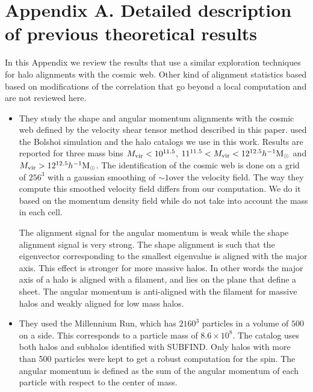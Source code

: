\documentclass[useAMS,usenatbib]{mn2e}
\newcommand{\hMpc}{{\ifmmode{h^{-1}{\rm Mpc}}\else{$h^{-1}$Mpc }\fi}}
\newcommand{\hMsun}{{\ifmmode{h^{-1}{\rm
        {M_{\odot}}}}\else{$h^{-1}{\rm{M_{\odot}}}$~}\fi}}
\begin{document}
\section*{Appendix A. Detailed description of previous theoretical results}

In this Appendix we review the results that use a similar exploration
techniques for halo alignments with the cosmic web. Other kind of
alignment statistics based based on modifications of the correlation
\citep[e.g.][]{Paz2008,Faltenbacher2009} that go beyond a local computation
and are not reviewed here.

\begin{itemize}


\item
\cite{Libeskind2013}

They study the shape and angular momentum alignments with the cosmic
web defined by the velocity shear tensor method described in this
paper.  \cite{Libeskind2013} used the Bolshoi simulation and the halo
catalogs we use in this work. Results are reported for three mass bins $M_{\rm
 vir}<10^{11.5}$\hMsun, $11^{11.5}<M_{\rm vir}<12^{12.5}\hMsun$ and
$M_{\rm  vir}>12^{12.5}\hMsun$. The identification of the cosmic web
is done on a grid of $256^3$ with a gaussian smoothing of $\sim
1$\hMpc over the velocity field. The way they compute this smoothed
velocity field differs from our computation. We do it based on the
momentum density field while \cite{Libesking2013} do not take into
account the mass in each cell.


The alignment signal for the angular momentum is weak while the shape
alignment signal is very strong. The shape alignment is such that the
eigenvector corresponding to the smallest eigenvalue is aligned with
the major axis. This effect is stronger for more massive halos.  In
other words the major axis of a halo is aligned with a filament, and
lies on the plane that define a sheet. The angular momentum is
anti-aligned with the filament for massive halos and weakly aligned
for low mass halos. 

\item
\cite{Trowland2013}

They used the Millennium Run, which has $2160^3$ particles in a volume
of $500$\hMpc on a side. This corresponds to a particle mass of
$8.6\times 10^{8}$\hMsun. The catalog uses both halos and subhalos
identified with SUBFIND. Only halos with more than 500 particles were
kept to get a robust computation for the spin. The angular momentum is
defined as the sum of the angular momentum of each particle with
respect to the center of mass. 



\end{itemize}
\end{document}
